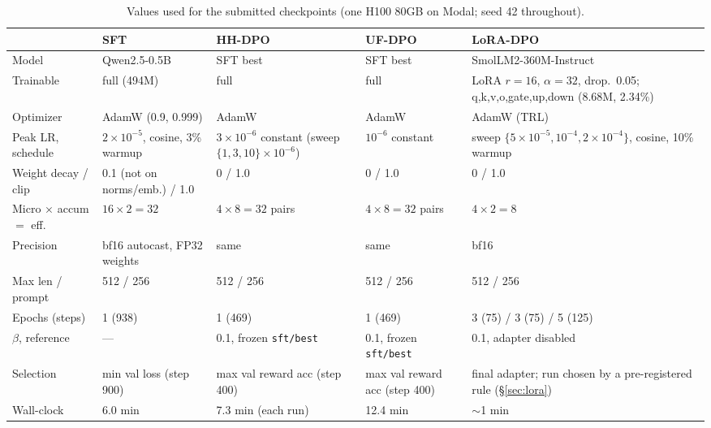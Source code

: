 \documentclass[10pt]{article}
\newcommand{\code}[1]{\texttt{\small #1}}
\begin{document}
\begin{table}[!htbp]
\centering\small
\caption{Values used for the submitted checkpoints (one H100 80GB on Modal; seed 42 throughout).}
\label{tab:config}
\begin{tabularx}{\linewidth}{@{}P{2.6cm} Y Y Y Y@{}}
\toprule
 & SFT & HH-DPO & UF-DPO & LoRA-DPO \\
\midrule
Model & Qwen2.5-0.5B & SFT best & SFT best & SmolLM2-360M-Instruct \\
Trainable & full (494M) & full & full & LoRA $r{=}16$, $\alpha{=}32$, drop.\ 0.05; q,k,v,o,gate,up,down (8.68M, 2.34\%) \\
Optimizer & AdamW (0.9, 0.999) & AdamW & AdamW & AdamW (TRL) \\
Peak LR, schedule & $2\!\times\!10^{-5}$, cosine, 3\% warmup & $3\!\times\!10^{-6}$ constant (sweep $\{1,3,10\}\!\times\!10^{-6}$) & $10^{-6}$ constant & sweep $\{5\!\times\!10^{-5}, 10^{-4}, 2\!\times\!10^{-4}\}$, cosine, 10\% warmup \\
Weight decay / clip & 0.1 (not on norms/emb.) / 1.0 & 0 / 1.0 & 0 / 1.0 & 0 / 1.0 \\
Micro $\times$ accum $=$ eff. & $16\times2=32$ & $4\times8=32$ pairs & $4\times8=32$ pairs & $4\times2=8$ \\
Precision & bf16 autocast, FP32 weights & same & same & bf16 \\
Max len / prompt & 512 / 256 & 512 / 256 & 512 / 256 & 512 / 256 \\
Epochs (steps) & 1 (938) & 1 (469) & 1 (469) & 3 (75) / 3 (75) / 5 (125) \\
$\beta$, reference & --- & 0.1, frozen \code{sft/best} & 0.1, frozen \code{sft/best} & 0.1, adapter disabled \\
Selection & min val loss (step 900) & max val reward acc (step 400) & max val reward acc (step 400) & final adapter; run chosen by a pre-registered rule (\S\ref{sec:lora}) \\
Wall-clock & 6.0 min & 7.3 min (each run) & 12.4 min & $\sim$1 min \\
\bottomrule
\end{tabularx}
\end{table}
\end{document}
